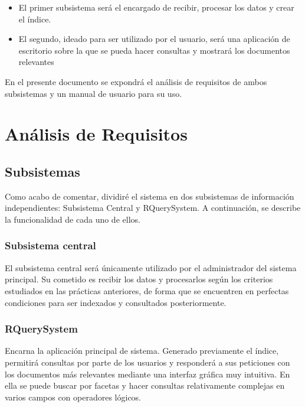 \begin{itemize}
	\item El primer subsistema será el encargado de recibir, procesar los datos y crear el índice.
	\item El segundo, ideado para ser utilizado por el usuario, será una aplicación de escritorio sobre la que se pueda hacer consultas y mostrará los documentos relevantes
\end{itemize}


En el presente documento se expondrá el análisis de requisitos de ambos subsistemas y un manual de usuario para su uso. 

\section{Análisis de Requisitos}

\subsection{Subsistemas}

Como acabo de comentar, dividiré el sistema en dos subsistemas de información independientes: Subsistema Central y RQuerySystem. A continuación, se describe la funcionalidad de cada uno de ellos.

\subsubsection{Subsistema central}

El subsistema central será únicamente utilizado por el administrador del sistema principal. Su cometido es recibir los datos y procesarlos según los criterios estudiados en las prácticas anteriores, de forma que se encuentren en perfectas condiciones para ser indexados y consultados posteriormente. 

\subsubsection{RQuerySystem}

Encarna la aplicación principal de sistema. Generado previamente el índice, permitirá consultas por parte de los usuarios y responderá a sus peticiones con los documentos más relevantes mediante una interfaz gráfica muy intuitiva. En ella se puede buscar por facetas y hacer consultas relativamente complejas en varios campos con operadores lógicos.

